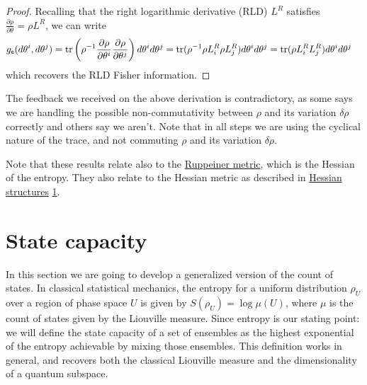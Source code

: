 \begin{mathSection}
\begin{proof}
	Recalling that the right logarithmic derivative (RLD) $L^R$ satisfies $\frac{\partial \rho}{\partial \theta} = \rho L^R$, we can write 
	\begin{equation}
		\begin{aligned}
			g_{\mathsf{e}}(d\theta^i, d\theta^j) &= \operatorname{tr}\left( \rho^{-1} \frac{\partial \rho}{\partial \theta^i }\frac{\partial \rho}{\partial \theta^j}\right) d\theta^i d\theta^j = \operatorname{tr}(\rho^{-1}\rho L^R
			_i \rho L^R_j)d\theta^i d\theta^j = \operatorname{tr}(\rho L^R
			_i L^R_j)d\theta^i d\theta^j
		\end{aligned}
	\end{equation}
	which recovers the RLD Fisher information.
\end{proof}

\begin{remark}
	The feedback we received on the above derivation is contradictory, as some says we are handling the possible non-commutativity between $\rho$ and its variation $\delta \rho$ correctly and others say we aren't. Note that in all steps we are using the cyclical nature of the trace, and not commuting $\rho$ and its variation $\delta \rho$.
\end{remark}

\begin{remark}
	Note that these results relate also to the \href{https://en.wikipedia.org/wiki/Ruppeiner_geometry}{Ruppeiner metric}, which is the Hessian of the entropy. They also relate to the Hessian metric as described in  \href{https://web.osu.cz/~Zusmanovich/seminar/2017/wolak/ostrava-11-17-hessian-pdf.pdf}{Hessian structures} \href{https://link.springer.com/chapter/10.1007/978-3-642-40020-9_4}{1}.
\end{remark}
\end{mathSection}

\section{State capacity}

In this section we are going to develop a generalized version of the count of states. In classical statistical mechanics, the entropy for a uniform distribution $\rho_U$ over a region of phase space $U$ is given by $S(\rho_U) = \log \mu(U)$, where $\mu$ is the count of states given by the Liouville measure. Since entropy is our stating point: we will define the state capacity of a set of ensembles as the highest exponential of the entropy achievable by mixing those ensembles. This definition works in general, and recovers both the classical Liouville measure and the dimensionality of a quantum subspace.

